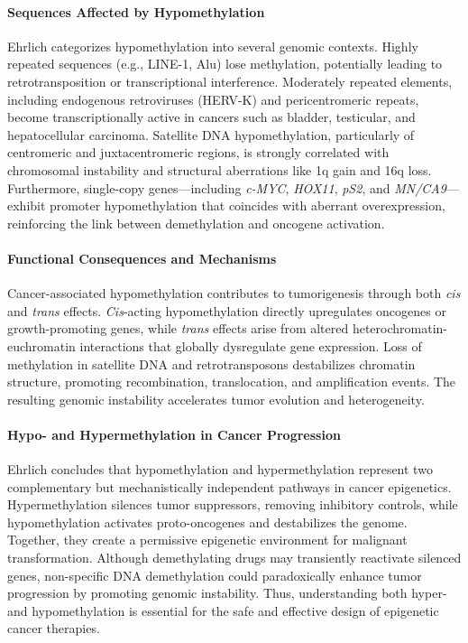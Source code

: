 \documentclass[10pt]{extarticle}
\begin{document}
\paragraph{Sequences Affected by Hypomethylation}
Ehrlich categorizes hypomethylation into several genomic contexts. Highly repeated sequences (e.g., LINE-1, Alu) lose methylation, potentially leading to retrotransposition or transcriptional interference. Moderately repeated elements, including endogenous retroviruses (HERV-K) and pericentromeric repeats, become transcriptionally active in cancers such as bladder, testicular, and hepatocellular carcinoma. Satellite DNA hypomethylation, particularly of centromeric and juxtacentromeric regions, is strongly correlated with chromosomal instability and structural aberrations like 1q gain and 16q loss. Furthermore, single-copy genes—including \textit{c-MYC}, \textit{HOX11}, \textit{pS2}, and \textit{MN/CA9}—exhibit promoter hypomethylation that coincides with aberrant overexpression, reinforcing the link between demethylation and oncogene activation.

\paragraph{Functional Consequences and Mechanisms}
Cancer-associated hypomethylation contributes to tumorigenesis through both \textit{cis} and \textit{trans} effects. \textit{Cis}-acting hypomethylation directly upregulates oncogenes or growth-promoting genes, while \textit{trans} effects arise from altered heterochromatin-euchromatin interactions that globally dysregulate gene expression. Loss of methylation in satellite DNA and retrotransposons destabilizes chromatin structure, promoting recombination, translocation, and amplification events. The resulting genomic instability accelerates tumor evolution and heterogeneity.

\paragraph{Hypo- and Hypermethylation in Cancer Progression}
Ehrlich concludes that hypomethylation and hypermethylation represent two complementary but mechanistically independent pathways in cancer epigenetics. Hypermethylation silences tumor suppressors, removing inhibitory controls, while hypomethylation activates proto-oncogenes and destabilizes the genome. Together, they create a permissive epigenetic environment for malignant transformation. Although demethylating drugs may transiently reactivate silenced genes, non-specific DNA demethylation could paradoxically enhance tumor progression by promoting genomic instability. Thus, understanding both hyper- and hypomethylation is essential for the safe and effective design of epigenetic cancer therapies.
\end{document}
